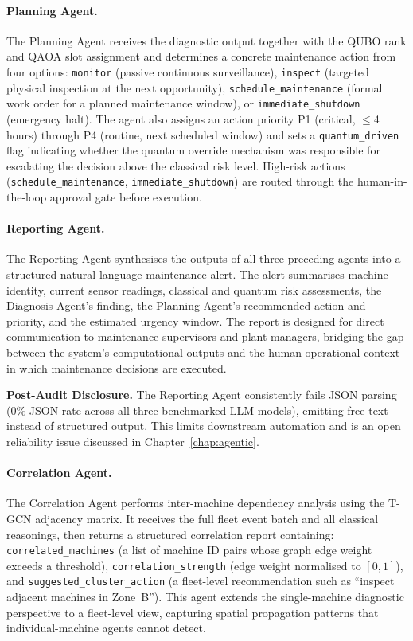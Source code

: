 \paragraph{Planning Agent.}
The Planning Agent receives the diagnostic output together with the QUBO rank and QAOA slot assignment and determines a concrete maintenance action from four options: \texttt{monitor} (passive continuous surveillance), \texttt{inspect} (targeted physical inspection at the next opportunity), \texttt{schedule\_maintenance} (formal work order for a planned maintenance window), or \texttt{immediate\_shutdown} (emergency halt). The agent also assigns an action priority P1 (critical, $\leq$4 hours) through P4 (routine, next scheduled window) and sets a \texttt{quantum\_driven} flag indicating whether the quantum override mechanism was responsible for escalating the decision above the classical risk level. High-risk actions (\texttt{schedule\_maintenance}, \texttt{immediate\_shutdown}) are routed through the human-in-the-loop approval gate before execution.

\paragraph{Reporting Agent.}
The Reporting Agent synthesises the outputs of all three preceding agents into a structured natural-language maintenance alert. The alert summarises machine identity, current sensor readings, classical and quantum risk assessments, the Diagnosis Agent's finding, the Planning Agent's recommended action and priority, and the estimated urgency window. The report is designed for direct communication to maintenance supervisors and plant managers, bridging the gap between the system's computational outputs and the human operational context in which maintenance decisions are executed.

\textbf{Post-Audit Disclosure.} The Reporting Agent consistently fails JSON parsing (0\% JSON rate across all three benchmarked LLM models), emitting free-text instead of structured output. This limits downstream automation and is an open reliability issue discussed in Chapter~\ref{chap:agentic}.

\paragraph{Correlation Agent.}
The Correlation Agent performs inter-machine dependency analysis using the T-GCN adjacency matrix. It receives the full fleet event batch and all classical reasonings, then returns a structured correlation report containing: \texttt{correlated\_machines} (a list of machine ID pairs whose graph edge weight exceeds a threshold), \texttt{correlation\_strength} (edge weight normalised to $[0,1]$), and \texttt{suggested\_cluster\_action} (a fleet-level recommendation such as ``inspect adjacent machines in Zone~B''). This agent extends the single-machine diagnostic perspective to a fleet-level view, capturing spatial propagation patterns that individual-machine agents cannot detect.

